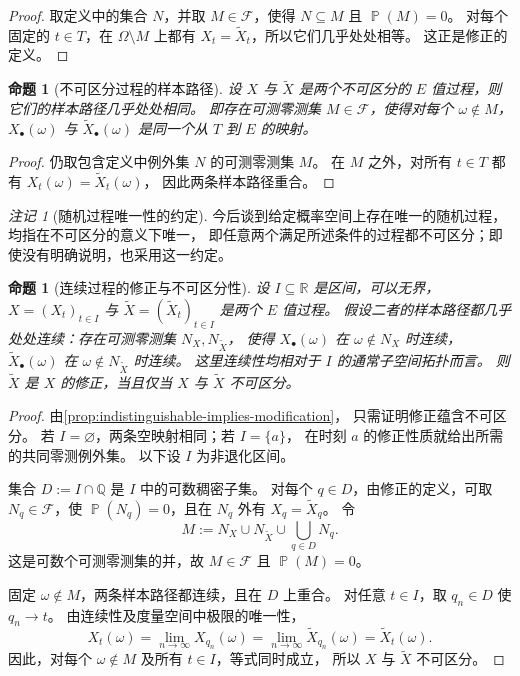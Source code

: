 \documentclass[UTF8,11pt,a4paper,oneside,fontset=fandol]{ctexrep}
\numberwithin{equation}{section}
\theoremstyle{plain}
\newtheorem{proposition}[theorem]{命题}
\theoremstyle{definition}
\theoremstyle{remark}
\newtheorem{remark}[theorem]{注记}
\newcommand{\Q}{\mathbb{Q}}
\newcommand{\R}{\mathbb{R}}
\newcommand{\F}{\mathcal{F}}
\DeclareMathOperator{\Prob}{\mathbb{P}}
\begin{document}
\begin{proof}
取定义中的集合 $N$，并取 $M\in\F$，使得 $N\subseteq M$ 且 $\Prob(M)=0$。
对每个固定的 $t\in T$，在 $\Omega\setminus M$ 上都有
$X_t=\widetilde X_t$，所以它们几乎处处相等。
这正是修正的定义。
\end{proof}

\begin{proposition}[不可区分过程的样本路径]
\label{prop:indistinguishable-same-paths}
设 $X$ 与 $\widetilde X$ 是两个不可区分的 $E$ 值过程，则它们的样本路径几乎处处相同。
即存在可测零测集 $M\in\F$，使得对每个 $\omega\notin M$，
$X_\bullet(\omega)$ 与 $\widetilde X_\bullet(\omega)$ 是同一个从 $T$ 到 $E$ 的映射。
\end{proposition}

\begin{proof}
仍取包含定义中例外集 $N$ 的可测零测集 $M$。
在 $M$ 之外，对所有 $t\in T$ 都有 $X_t(\omega)=\widetilde X_t(\omega)$，
因此两条样本路径重合。
\end{proof}

\begin{remark}[随机过程唯一性的约定]
\label{rem:process-uniqueness-convention}
今后谈到给定概率空间上存在唯一的随机过程，均指在不可区分的意义下唯一，
即任意两个满足所述条件的过程都不可区分；即使没有明确说明，也采用这一约定。
\end{remark}

\begin{proposition}[连续过程的修正与不可区分性]
\label{prop:continuous-modifications-indistinguishable}
设 $I\subseteq\R$ 是区间，可以无界，
$X=(X_t)_{t\in I}$ 与 $\widetilde X=(\widetilde X_t)_{t\in I}$ 是两个 $E$ 值过程。
假设二者的样本路径都几乎处处连续：存在可测零测集 $N_X,N_{\widetilde X}$，
使得 $X_\bullet(\omega)$ 在 $\omega\notin N_X$ 时连续，
$\widetilde X_\bullet(\omega)$ 在 $\omega\notin N_{\widetilde X}$ 时连续。
这里连续性均相对于 $I$ 的通常子空间拓扑而言。
则 $\widetilde X$ 是 $X$ 的修正，当且仅当 $X$ 与 $\widetilde X$ 不可区分。
\end{proposition}

\begin{proof}
由\cref{prop:indistinguishable-implies-modification}，
只需证明修正蕴含不可区分。
若 $I=\varnothing$，两条空映射相同；若 $I=\{a\}$，
在时刻 $a$ 的修正性质就给出所需的共同零测例外集。
以下设 $I$ 为非退化区间。

集合 $D:=I\cap\Q$ 是 $I$ 中的可数稠密子集。
对每个 $q\in D$，由修正的定义，可取 $N_q\in\F$，使
$\Prob(N_q)=0$，且在 $N_q$ 外有 $X_q=\widetilde X_q$。
令
\[
  M:=N_X\cup N_{\widetilde X}\cup\bigcup_{q\in D}N_q.
\]
这是可数个可测零测集的并，故 $M\in\F$ 且 $\Prob(M)=0$。

固定 $\omega\notin M$，两条样本路径都连续，且在 $D$ 上重合。
对任意 $t\in I$，取 $q_n\in D$ 使 $q_n\to t$。
由连续性及度量空间中极限的唯一性，
\[
  X_t(\omega)
  =\lim_{n\to\infty}X_{q_n}(\omega)
  =\lim_{n\to\infty}\widetilde X_{q_n}(\omega)
  =\widetilde X_t(\omega).
\]
因此，对每个 $\omega\notin M$ 及所有 $t\in I$，等式同时成立，
所以 $X$ 与 $\widetilde X$ 不可区分。
\end{proof}
\end{document}
